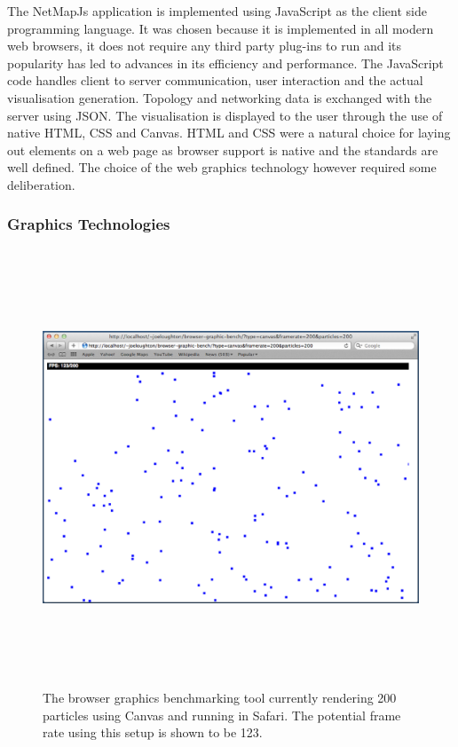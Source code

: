 \documentclass[11pt, a4paper]{article}
\begin{document}
The NetMapJs application is implemented using JavaScript as the client side
programming language. It was chosen because it is implemented in all modern web
browsers, it does not require any third party plug-ins to run and its popularity
has led to advances in its efficiency and performance. The JavaScript code
handles client to server communication, user interaction and the actual
visualisation generation. Topology and networking data is exchanged with the
server using JSON. The visualisation is displayed to the user through the use of
native HTML, CSS and Canvas. HTML and CSS were a natural choice for laying out
elements on a web page as browser support is native and the standards are well
defined. The choice of the web graphics technology however required some
deliberation. 


\subsubsection{Graphics Technologies}

\begin{figure}
\centering
\includegraphics[width=170mm,height=130.08mm]{assets/benchmark-tool.eps}
\caption{The browser graphics benchmarking tool currently rendering 200
particles using Canvas and running in Safari. The potential frame rate using
this setup is shown to be 123.}
\label{fig:benchmark-tool}
\end{figure}
\end{document}
